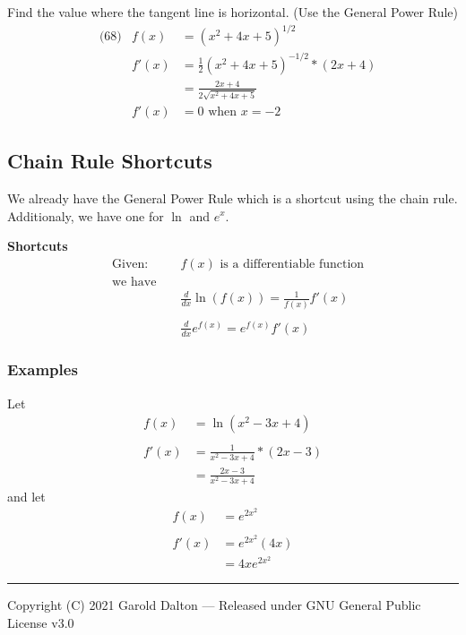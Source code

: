 \documentclass[14pt]{extarticle}
\begin{document}
Find the value where the tangent line is horizontal. (Use the General Power Rule)
\begin{align*}
	&\text{(68)} &f(x) &= (x^2 +4x+5)^{1/2} \\
	&			&f'(x)	&= \frac{1}{2}(x^2 +4x+5)^{-1/2}*(2x +4) \\
	&	&		&= \frac{2x +4}{2 \sqrt{x^2 +4x+5}} \\
	&	&		f'(x)&=0 \text{ when } x=-2
\end{align*} 


\subsection{Chain Rule Shortcuts}
We already have the General Power Rule which is a shortcut using the chain rule. Additionaly, we have one for $\ln$ and $e^x$.

\begin{tcolorbox}[enhanced jigsaw,colback=bg,boxrule=0pt,arc=0pt]
	\textbf{Shortcuts}
	\begin{align*}
		&\text{Given: } & &f(x) \text{ is a differentiable function} \\
		&\text{we have }\\
		& & &\frac{d}{dx}\ln(f(x)) = \frac{1}{f(x)}f'(x) \\\\
		& & &\frac{d}{dx}e^{f(x)} = e^{f(x)}f'(x)
	\end{align*}
\end{tcolorbox}

\subsubsection{Examples}
Let
\begin{align*}
	f(x) &= \ln(x^2 - 3x + 4) \\\\
	f'(x)	&= \frac{1}{x^2-3x+4}*(2x-3) \\
			&= \frac{2x-3}{x^2-3x+4}
\end{align*}
and let
\begin{align*}
	f(x) &= e^{2x^2} \\\\
	f'(x)	&= e^{2x^2}(4x) \\
	&= 4xe^{2x^2}
\end{align*}




\noindent\rule{\textwidth}{1pt}
{\footnotesize Copyright (C) 2021 Garold Dalton --- Released under GNU General Public License v3.0}


\cleardoublepage
\end{document}
